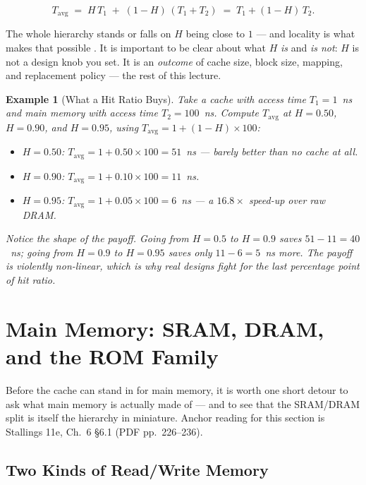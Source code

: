 \documentclass[11pt]{article}
\newtheorem{example}{Example}[section]
\begin{document}
\[
  T_{\text{avg}} \;=\; H\,T_1 \;+\; (1-H)\,(T_1 + T_2)
                \;=\; T_1 + (1-H)\,T_2 .
\]

The whole hierarchy stands or falls on $H$ being close to $1$ --- and locality is what makes that possible \cite[\S4.3, Fig.~4.8, PDF p.~162]{Stallings2015_computer_organization}. It is important to be clear about what $H$ \emph{is} and \emph{is not}: $H$ is not a design knob you set. It is an \emph{outcome} of cache size, block size, mapping, and replacement policy --- the rest of this lecture.

\begin{example}[What a Hit Ratio Buys]
\label{ex:hit-ratio}
Take a cache with access time $T_1 = 1$~ns and main memory with access time $T_2 = 100$~ns. Compute $T_{\text{avg}}$ at $H = 0.50$, $H = 0.90$, and $H = 0.95$, using $T_{\text{avg}} = 1 + (1-H)\times 100$:

\begin{itemize}
  \item $H = 0.50$: $T_{\text{avg}} = 1 + 0.50 \times 100 = 51$~ns --- barely better than no cache at all.
  \item $H = 0.90$: $T_{\text{avg}} = 1 + 0.10 \times 100 = 11$~ns.
  \item $H = 0.95$: $T_{\text{avg}} = 1 + 0.05 \times 100 = 6$~ns --- a $16.8\times$ speed-up over raw DRAM.
\end{itemize}

Notice the shape of the payoff. Going from $H=0.5$ to $H=0.9$ saves $51 - 11 = 40$~ns; going from $H=0.9$ to $H=0.95$ saves only $11 - 6 = 5$~ns more. The payoff is violently non-linear, which is why real designs fight for the last percentage point of hit ratio.
\end{example}

\section{Main Memory: SRAM, DRAM, and the ROM Family}
\label{sec:main-memory}

Before the cache can stand in for main memory, it is worth one short detour to ask what main memory is actually made of --- and to see that the SRAM/DRAM split is itself the hierarchy in miniature. Anchor reading for this section is Stallings 11e, Ch.~6 \S6.1 (PDF pp.~226--236).

\subsection{Two Kinds of Read/Write Memory}
\end{document}
